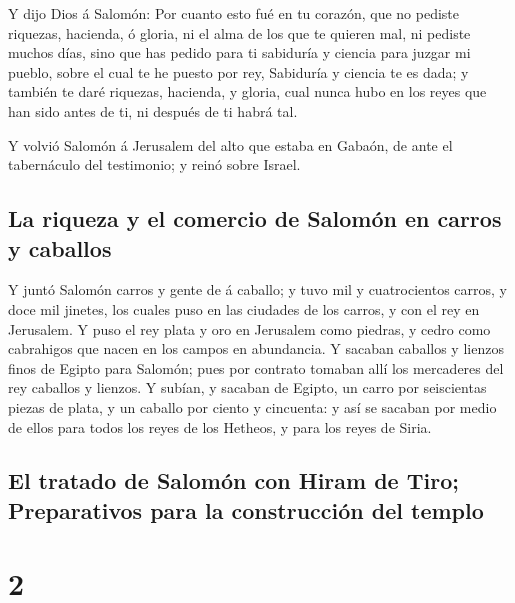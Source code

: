  Y dijo Dios á Salomón: Por cuanto esto fué en tu
corazón, que no pediste riquezas, hacienda, ó gloria, ni el alma de los
que te quieren mal, ni pediste muchos días, sino que has pedido para ti
sabiduría y ciencia para juzgar mi pueblo, sobre el cual te he puesto
por rey,  Sabiduría y ciencia te es dada; y también te
daré riquezas, hacienda, y gloria, cual nunca hubo en los reyes que han
sido antes de ti, ni después de ti habrá tal.

 Y volvió Salomón á Jerusalem del alto que estaba en
Gabaón, de ante el tabernáculo del testimonio; y reinó sobre Israel.

\hypertarget{la-riqueza-y-el-comercio-de-salomuxf3n-en-carros-y-caballos}{%
\subsection{La riqueza y el comercio de Salomón en carros y
caballos}\label{la-riqueza-y-el-comercio-de-salomuxf3n-en-carros-y-caballos}}

 Y juntó Salomón carros y gente de á caballo; y tuvo mil
y cuatrocientos carros, y doce mil jinetes, los cuales puso en las
ciudades de los carros, y con el rey en Jerusalem.  Y
puso el rey plata y oro en Jerusalem como piedras, y cedro como
cabrahigos que nacen en los campos en abundancia.  Y
sacaban caballos y lienzos finos de Egipto para Salomón; pues por
contrato tomaban allí los mercaderes del rey caballos y lienzos.
 Y subían, y sacaban de Egipto, un carro por seiscientas
piezas de plata, y un caballo por ciento y cincuenta: y así se sacaban
por medio de ellos para todos los reyes de los Hetheos, y para los reyes
de Siria.

\hypertarget{el-tratado-de-salomuxf3n-con-hiram-de-tiro-preparativos-para-la-construcciuxf3n-del-templo}{%
\subsection{El tratado de Salomón con Hiram de Tiro; Preparativos para
la construcción del
templo}\label{el-tratado-de-salomuxf3n-con-hiram-de-tiro-preparativos-para-la-construcciuxf3n-del-templo}}

\hypertarget{section-14-2}{%
\section{2}\label{section-14-2}}

